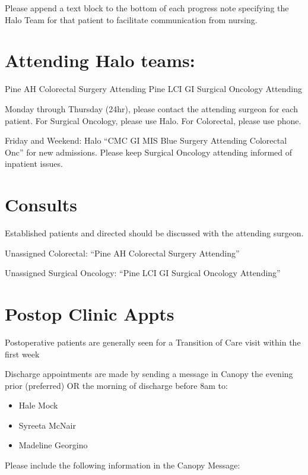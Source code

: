 \documentclass[
]{book}
\providecommand{\tightlist}{%
  \setlength{\itemsep}{0pt}\setlength{\parskip}{0pt}}
\begin{document}
Please append a text block to the bottom of each progress note specifying the Halo Team for that patient to facilitate communication from nursing.

\hypertarget{attending-halo-teams}{%
\section{Attending Halo teams:}\label{attending-halo-teams}}

Pine AH Colorectal Surgery Attending
Pine LCI GI Surgical Oncology Attending

Monday through Thursday (24hr), please contact the attending surgeon for each patient. For Surgical Oncology, please use Halo. For Colorectal, please use phone.

Friday and Weekend: Halo ``CMC GI MIS Blue Surgery Attending Colorectal Onc'' for new admissions. Please keep Surgical Oncology attending informed of inpatient issues.

\hypertarget{consults-1}{%
\section{Consults}\label{consults-1}}

Established patients and directed should be discussed with the attending surgeon.

Unassigned Colorectal: ``Pine AH Colorectal Surgery Attending''

Unassigned Surgical Oncology: ``Pine LCI GI Surgical Oncology Attending''

\hypertarget{postop-clinic-appts-1}{%
\section{Postop Clinic Appts}\label{postop-clinic-appts-1}}

Postoperative patients are generally seen for a Transition of Care visit within the first week

Discharge appointments are made by sending a message in Canopy the evening prior (preferred) OR the morning of discharge before 8am to:

\begin{itemize}
\tightlist
\item
  Hale Mock
\item
  Syreeta McNair
\item
  Madeline Georgino
\end{itemize}

Please include the following information in the Canopy Message:
\end{document}
